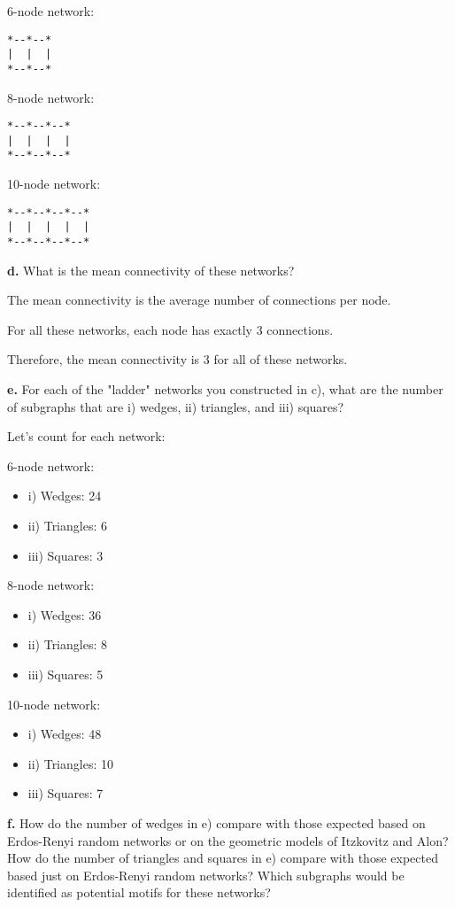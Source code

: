 \documentclass{article}
\begin{document}
6-node network:
\begin{verbatim}
*--*--*
|  |  |
*--*--* 
\end{verbatim}


8-node network:
\begin{verbatim}
*--*--*--*
|  |  |  |
*--*--*--*
\end{verbatim}

10-node network:
\begin{verbatim}
*--*--*--*--*
|  |  |  |  |
*--*--*--*--*
\end{verbatim}

\textbf{d.} What is the mean connectivity of these networks?

The mean connectivity is the average number of connections per node.

For all these networks, each node has exactly 3 connections.

Therefore, the mean connectivity is 3 for all of these networks.

\textbf{e.} For each of the "ladder" networks you constructed in c), what are the number of subgraphs that are i) wedges, ii) triangles, and iii) squares?

Let's count for each network:

6-node network:
\begin{itemize}
    \item i) Wedges: 24
    \item ii) Triangles: 6
    \item iii) Squares: 3
\end{itemize}
8-node network:
\begin{itemize}
    \item i) Wedges: 36
    \item ii) Triangles: 8
    \item iii) Squares: 5
\end{itemize}

10-node network:
\begin{itemize}
    \item i) Wedges: 48
    \item ii) Triangles: 10
    \item iii) Squares: 7
\end{itemize}

\textbf{f.} How do the number of wedges in e) compare with those expected based on Erdos-Renyi random networks or on the geometric models of Itzkovitz and Alon? How do the number of triangles and squares in e) compare with those expected based just on Erdos-Renyi random networks? Which subgraphs would be identified as potential motifs for these networks?
\end{document}
